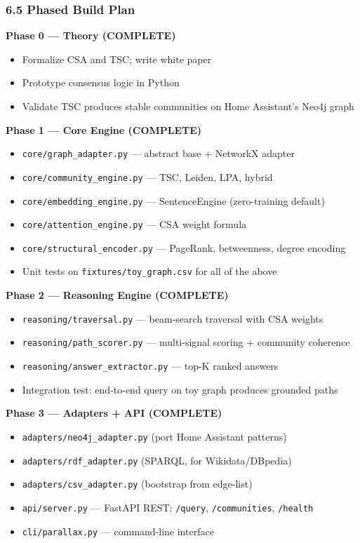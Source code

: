 \documentclass[10pt,journal,compsoc]{IEEEtran}
\begin{document}
\subsubsection{6.5 Phased Build Plan}

\textbf{Phase 0 — Theory (COMPLETE)}
\begin{itemize}
\item Formalize CSA and TSC; write white paper
\item Prototype consensus logic in Python
\item Validate TSC produces stable communities on Home Assistant's Neo4j graph

\end{itemize}
\textbf{Phase 1 — Core Engine (COMPLETE)}
\begin{itemize}
\item \texttt{core/graph\_adapter.py} — abstract base + NetworkX adapter
\item \texttt{core/community\_engine.py} — TSC, Leiden, LPA, hybrid
\item \texttt{core/embedding\_engine.py} — SentenceEngine (zero-training default)
\item \texttt{core/attention\_engine.py} — CSA weight formula
\item \texttt{core/structural\_encoder.py} — PageRank, betweenness, degree encoding
\item Unit tests on \texttt{fixtures/toy\_graph.csv} for all of the above

\end{itemize}
\textbf{Phase 2 — Reasoning Engine (COMPLETE)}
\begin{itemize}
\item \texttt{reasoning/traversal.py} — beam-search traversal with CSA weights
\item \texttt{reasoning/path\_scorer.py} — multi-signal scoring + community coherence
\item \texttt{reasoning/answer\_extractor.py} — top-K ranked answers
\item Integration test: end-to-end query on toy graph produces grounded paths

\end{itemize}
\textbf{Phase 3 — Adapters + API (COMPLETE)}
\begin{itemize}
\item \texttt{adapters/neo4j\_adapter.py} (port Home Assistant patterns)
\item \texttt{adapters/rdf\_adapter.py} (SPARQL, for Wikidata/DBpedia)
\item \texttt{adapters/csv\_adapter.py} (bootstrap from edge-list)
\item \texttt{api/server.py} — FastAPI REST: \texttt{/query}, \texttt{/communities}, \texttt{/health}
\item \texttt{cli/parallax.py} — command-line interface

\end{itemize}
\end{document}
